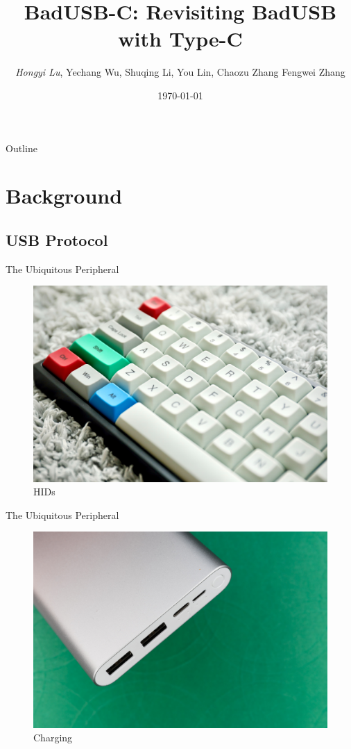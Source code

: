\documentclass{beamer}
\title{BadUSB-C: Revisiting BadUSB with Type-C}
\author{\textit{Hongyi Lu}, Yechang Wu, Shuqing Li, You Lin, Chaozu Zhang Fengwei Zhang}
\institute{Southern University of Science and Technology}
\date{\today}
\begin{document}
\begin{frame}
	\vfill
	\titlepage
	\vfill
\end{frame}
\begin{frame}{Outline}
	\tableofcontents
\end{frame}
\section{Background}
\subsection{USB Protocol}
\begin{frame}{The Ubiquitous Peripheral}
	\begin{figure}[htbp]
		\includegraphics[width=.7\textwidth]{Figs/keyboard.jpg}
		\caption*{HIDs}
	\end{figure}
\end{frame}
\begin{frame}{The Ubiquitous Peripheral}
	\begin{figure}[htbp]
		\includegraphics[width=.7\textwidth]{Figs/powerbank.jpg}
		\caption*{Charging}
	\end{figure}
\end{frame}
\end{document}
